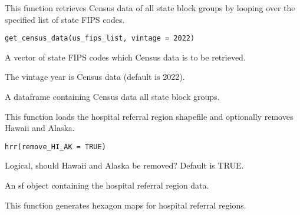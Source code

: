 \documentclass[a4paper]{book}
\begin{document}
%
\begin{Description}
This function retrieves Census data of all state block groups by looping
over the specified list of state FIPS codes.
\end{Description}
%
\begin{Usage}
\begin{verbatim}
get_census_data(us_fips_list, vintage = 2022)
\end{verbatim}
\end{Usage}
%
\begin{Arguments}
\begin{ldescription}
\item[\code{us\_fips\_list}] A vector of state FIPS codes which Census data is to be retrieved.

\item[\code{vintage}] The vintage year is Census data (default is 2022).
\end{ldescription}
\end{Arguments}
%
\begin{Value}
A dataframe containing Census data all state block groups.
\end{Value}
%
\begin{Description}
This function loads the hospital referral region shapefile and optionally removes Hawaii and Alaska.
\end{Description}
%
\begin{Usage}
\begin{verbatim}
hrr(remove_HI_AK = TRUE)
\end{verbatim}
\end{Usage}
%
\begin{Arguments}
\begin{ldescription}
\item[\code{remove\_HI\_AK}] Logical, should Hawaii and Alaska be removed? Default is TRUE.
\end{ldescription}
\end{Arguments}
%
\begin{Value}
An sf object containing the hospital referral region data.
\end{Value}
%
\begin{Description}
This function generates hexagon maps for hospital referral regions.
\end{Description}
\end{document}
